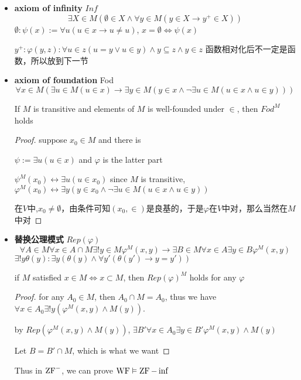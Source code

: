 \documentclass[11pt]{article}
\begin{document}
\begin{itemize}
\begin{proof}
for any \(X\in M\), \(\calp(X)\in M\). and we prove \(\calp(X)\) is the \(Y\), for any \(u\in M\)
\end{proof}
\item \textbf{axiom of infinity} \(Inf\)
\begin{equation*}
\exists X\in M(\emptyset\in X\wedge\forall y\in M(y\in X\to y^+\in X))
\end{equation*}
\(\emptyset:\psi(x):=\forall u(u\in x\to u\neq u)\), \(x=\emptyset\Leftrightarrow\psi(x)\)

\(y^+:\varphi(y,z):\forall u\in z(u=y\vee u\in y)\wedge y\subseteq z\wedge y\in z\)
函数相对化后不一定是函数，所以放到下一节
\item \textbf{axiom of foundation} Fod
\begin{equation*}
\forall x\in M(\exists u\in M(u\in x)\to\exists y\in M(y\in x\wedge\neg\exists u\in M(u\in x\wedge u\in y)))
\end{equation*}
\begin{lemma}[]
If \(M\) is transitive and elements of \(M\) is well-founded under \(\in\), then \(Fod^M\) holds
\end{lemma}

\begin{proof}
suppose \(x_0\in M\) and there is

\(\psi:=\exists u(u\in x)\) and \(\varphi\) is the latter part

\(\psi^M(x_0)\leftrightarrow\exists u(u\in x_0)\) since \(M\) is transitive, \(\varphi^M(x_0)\leftrightarrow\exists y(y\in x_0\wedge\neg\exists u\in M(u\in x\wedge u\in y))\)

在\(V\)中,\(x_0\neq\emptyset\)，由条件可知\((x_0,\in)\)是良基的，于是\(\varphi\)在\(V\)中对，那么当然在\(M\)中对
\end{proof}
\item \textbf{替换公理模式} \(Rep(\varphi)\)
\begin{equation*}
\forall A\in M\forall x\in A\cap M\exists !y\in M\varphi^M(x,y)\to\exists B\in M\forall x\in A\exists y\in B\varphi^M(x,y)
\end{equation*}
\(\exists!y\theta(y):\exists y(\theta(y)\wedge\forall y'(\theta(y')\to y=y'))\)
\begin{lemma}[]
if \(M\) satisfied \(x\in M\Leftrightarrow x\subset M\), then \(Rep(\varphi)^M\) holds for any \(\varphi\)
\end{lemma}

\begin{proof}
for any \(A_0\in M\), then \(A_0\cap M=A_0\), thus we have
\(\forall x\in A_0\exists!y(\varphi^M(x,y)\wedge M(y))\).

by \(Rep(\varphi^M(x,y)\wedge M(y))\),
\(\exists B'\forall x\in A_0\exists y\in B'\varphi^M(x,y)\wedge M(y)\)

Let \(B=B'\cap M\), which is what we want
\end{proof}

Thus in \(\text{ZF}^-\), we can prove \(\operatorname{WF}\vDash\operatorname{ZF}-\inf\)
\end{itemize}
\end{document}

